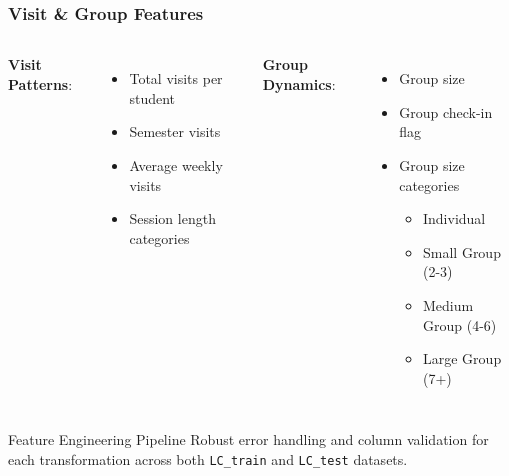 \documentclass{beamer}
\begin{document}
\begin{frame}
\frametitle{Visit \& Group Features}
    \begin{columns} %
        \textbf{Visit Patterns}:
            \begin{itemize}
            \item Total visits per student
            \item Semester visits
            \item Average weekly visits
            \item Session length categories
            \end{itemize}
            
        \textbf{Group Dynamics}:
            \begin{itemize}
            \item Group size
            \item Group check-in flag
            \item Group size categories
                \begin{itemize}
                \item Individual
                \item Small Group (2-3)
                \item Medium Group (4-6)
                \item Large Group (7+)
                \end{itemize}
            \end{itemize}
    \end{columns}

    \begin{alertblock}{Feature Engineering Pipeline}
        Robust error handling and column validation for each transformation across both \texttt{LC\_train} and \texttt{LC\_test} datasets.
    \end{alertblock}
\end{frame}
\end{document}
